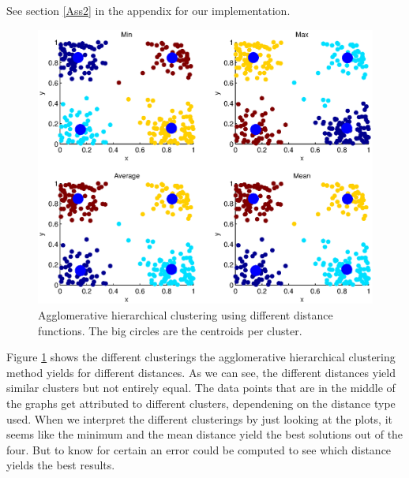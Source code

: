 \documentclass[10pt]{article}
\begin{document}
\subsection{}
See section \ref{Ass2} in the appendix for our implementation.
\begin{figure}
	\includegraphics[width=\columnwidth]{Ass2_1.eps}
	\caption{Agglomerative hierarchical clustering using different distance functions. The big circles are the centroids per cluster.}
	\label{fig2a}
\end{figure}
Figure \ref{fig2a} shows the different clusterings the agglomerative hierarchical clustering method yields for different distances. As we can see, the different distances yield similar clusters but not entirely equal. The data points that are in the middle of the graphs get attributed to different clusters, dependening on the distance type used. When we interpret the different clusterings by just looking at the plots, it seems like the minimum and the mean distance yield the best solutions out of the four. But to know for certain an error could be computed to see which distance yields the best results.
\end{document}
